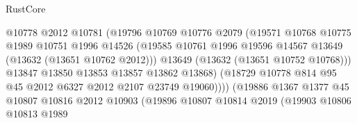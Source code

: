 \begin{lexlean}{RustCore}
\begin{coremodule}
                                      @10778
                                      @2012
                                      @10781
                                      (@19796
                                        @10769
                                        @10776
                                        @2079
                                        (@19571
                                          @10768
                                          @10775
                                          @1989
                                          @10751
                                          @1996
                                          @14526
                                          (@19585
                                            @10761
                                            @1996
                                            @19596
                                            @14567
                                            @13649
                                            (@13632 (@13651 @10762 @2012)))
                                          @13649
                                          (@13632 (@13651 @10752 @10768)))
                                        @13847
                                        @13850
                                        @13853
                                        @13857
                                        @13862
                                        @13868)
                                      (@18729
                                        @10778
                                        @814
                                        @95
                                        @45
                                        @2012
                                        @6327
                                        @2012
                                        @2107
                                        @23749
                                        @19060))))
                                (@19886
                                  @1367
                                  @1377
                                  @45
                                  @10807
                                  @10816
                                  @2012
                                  @10903
                                  (@19896
                                    @10807
                                    @10814
                                    @2019
                                    (@19903
                                      @10806
                                      @10813
                                      @1989

\end{coremodule}
\end{lexlean}
